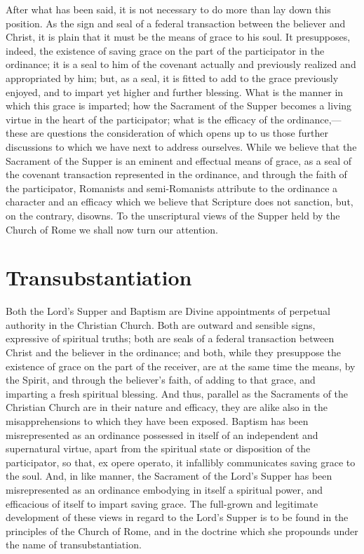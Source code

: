 \documentclass[]{book}
\begin{document}
After what has been said, it is not necessary to do more than lay down this position. As the sign and seal of a federal transaction between the believer and Christ, it is plain that it must be the means of grace to his soul. It presupposes, indeed, the existence of saving grace on the part of the participator in the ordinance; it is a seal to him of the covenant actually and previously realized and appropriated by him; but, as a seal, it is fitted to add to the grace previously enjoyed, and to impart yet higher and further blessing. What is the manner in which this grace is imparted; how the Sacrament of the Supper becomes a living virtue in the heart of the participator; what is the efficacy of the ordinance,---these are questions the consideration of which opens up to us those further discussions to which we have next to address ourselves. While we believe that the Sacrament of the Supper is an eminent and effectual means of grace, as a seal of the covenant transaction represented in the ordinance, and through the faith of the participator, Romanists and semi-Romanists attribute to the ordinance a character and an efficacy which we believe that Scripture does not sanction, but, on the contrary, disowns. To the unscriptural views of the Supper held by the Church of Rome we shall now turn our attention.

\hypertarget{transubstantiation}{%
\section{Transubstantiation}\label{transubstantiation}}

Both the Lord's Supper and Baptism are Divine appointments of perpetual authority in the Christian Church. Both are outward and sensible signs, expressive of spiritual truths; both are seals of a federal transaction between Christ and the believer in the ordinance; and both, while they presuppose the existence of grace on the part of the receiver, are at the same time the means, by the Spirit, and through the believer's faith, of adding to that grace, and imparting a fresh spiritual blessing. And thus, parallel as the Sacraments of the Christian Church are in their nature and efficacy, they are alike also in the misapprehensions to which they have been exposed. Baptism has been misrepresented as an ordinance possessed in itself of an independent and supernatural virtue, apart from the spiritual state or disposition of the participator, so that, ex opere operato, it infallibly communicates saving grace to the soul. And, in like manner, the Sacrament of the Lord's Supper has been misrepresented as an ordinance embodying in itself a spiritual power, and efficacious of itself to impart saving grace. The full-grown and legitimate development of these views in regard to the Lord's Supper is to be found in the principles of the Church of Rome, and in the doctrine which she propounds under the name of transubstantiation.
\end{document}
